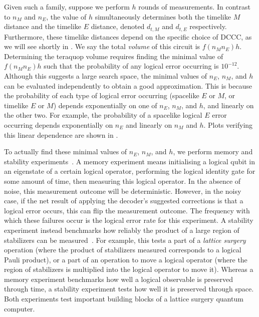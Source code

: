 Given such a family, suppose we perform $h$ rounds of measurements.
In contrast to $n_M$ and $n_E$, the value of $h$ simultaneously determines both the timelike $M$ distance and the timelike $E$ distance, denoted $d_{t,M}$ and $d_{t,E}$ respectively.
Furthermore, these timelike distances depend on the specific choice of DCCC, as we will see shortly in .
We say the total \textit{volume} of this circuit is $f(n_M n_E) h$.
Determining the teraquop volume requires finding the minimal value of $f(n_M n_E) h$ such that the probability of any logical error occurring is $10^{-12}$.
Although this suggests a large search space, the minimal values of $n_E$, $n_M$, and $h$ can be evaluated independently to obtain a good approximation.
This is because the probability of each type of logical error occurring (spacelike $E$ or $M$, or timelike $E$ or $M$) depends exponentially on one of $n_E$, $n_M$, and $h$, and linearly on the other two.
For example, the probability of a spacelike logical $E$ error occurring depends exponentially on $n_E$ and linearly on $n_M$ and $h$.
Plots verifying this linear dependence are shown in .

To actually find these minimal values of $n_E$, $n_M$, and $h$, we perform memory and stability experiments~\cite{gidney2022stability}.
A memory experiment means initialising a logical qubit in an eigenstate of a certain logical operator,
performing the logical identity gate for some amount of time,
then measuring this logical operator.
In the absence of noise, this measurement outcome will be deterministic.
However, in the noisy case, if the net result of applying the decoder's suggested corrections is that a logical error occurs, this can flip the measurement outcome.
The frequency with which these failures occur is the logical error rate for this experiment.
A stability experiment instead benchmarks how reliably the product of a large region of stabilizers can be measured~\cite{gidney2022stability}.
For example, this tests a part of a \textit{lattice surgery} operation (where the product of stabilizers measured corresponds to a logical Pauli product), or a part of an operation to move a logical operator (where the region of stabilizers is multiplied into the logical operator to move it).
Whereas a memory experiment benchmarks how well a logical observable is preserved through time, a stability experiment tests how well it is preserved through space.
Both experiments test important building blocks of a lattice surgery quantum computer.

